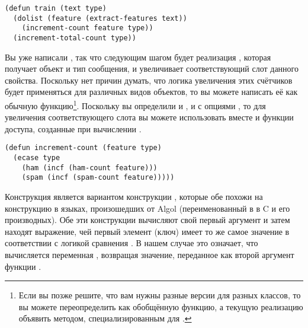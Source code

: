 \begin{lstlisting}
(defun train (text type)
  (dolist (feature (extract-features text))
    (increment-count feature type))
  (increment-total-count type))
\end{lstlisting}

Вы уже написали , так что следующим шагом будет реализация
, которая получает объект  и тип сообщения, и
увеличивает соответствующий слот данного свойства.  Поскольку нет причин думать, что
логика увеличения этих счётчиков будет применяться для различных видов объектов, то вы
можете написать её как обычную функцию\footnote{Если вы позже решите, что вам нужны
  разные версии  для разных классов, то вы можете переопределить
   как обобщённую функцию, а текущую реализацию объявить методом,
  специализированным для .}.  Поскольку вы определили и ,
и  с опциями , то для увеличения соответствующего слота
вы можете использовать вместе  и функции доступа, созданные при вычислении
.

\begin{lstlisting}
(defun increment-count (feature type)
  (ecase type
    (ham (incf (ham-count feature)))
    (spam (incf (spam-count feature)))))
\end{lstlisting}

Конструкция  является вариантом конструкции , которые обе похожи на
конструкцию  в языках, произошедших от Algol (переименованный в  в
C и его производных).  Обе эти конструкции вычисляют свой первый аргумент и затем находят
выражение, чей первый элемент (ключ) имеет то же самое значение в соответствии с логикой
сравнения .  В нашем случае это означает, что вычисляется переменная
, возвращая значение, переданное как второй аргумент функции
.

